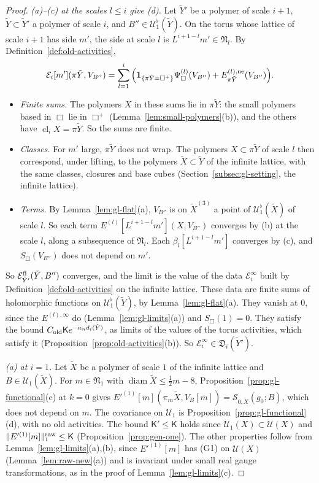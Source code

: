 \begin{proof}
\emph{(a)--(c) at the scales $l\le i$ give (d).} Let $\tilde Y'$ be a polymer of scale $i+1$, $\tilde Y\subset\tilde Y'$ a polymer of scale $i$, and $B''\in\mathcal U^\flat_1(\tilde Y)$. On the torus whose lattice of scale $i+1$ has side $m'$, the side at scale $l$ is $L^{i+1-l}m'\in\mathfrak N_l$. By Definition~\ref{def:old-activities},
\[
\mathcal E_i[m'](\pi\tilde Y,V_{B''})=\sum_{l=1}^i\Big(\mathbf 1_{\{\pi\tilde Y=\Box^+\}}\Psi^{(l)}_\Box(V_{B''})+E^{(l),\rm ne}_{\pi\tilde Y}(V_{B''})\Big).
\]
\begin{itemize}
\item \emph{Finite sums.} The polymers $X$ in these sums lie in $\pi\tilde Y$: the small polymers based in $\Box$ lie in $\Box^+$ (Lemma~\ref{lem:small-polymers}(b)), and the others have $\operatorname{cl}_iX=\pi\tilde Y$. So the sums are finite.
\item \emph{Classes.} For $m'$ large, $\pi\tilde Y$ does not wrap. The polymers $X\subset\pi\tilde Y$ of scale $l$ then correspond, under lifting, to the polymers $\tilde X\subset\tilde Y$ of the infinite lattice, with the same classes, closures and base cubes (Section~\ref{subsec:gl-setting}, the infinite lattice).
\item \emph{Terms.} By Lemma~\ref{lem:gl-flat}(a), $V_{B''}$ is on $\tilde X^{(3)}$ a point of $\mathcal U^\flat_1(\tilde X)$ of scale $l$. So each term $E^{(l)}[L^{i+1-l}m'](X,V_{B''})$ converges by (b) at the scale $l$, along a subsequence of $\mathfrak N_l$. Each $\beta_l[L^{i+1-l}m']$ converges by (c), and $S_\Box(V_{B''})$ does not depend on $m'$.
\end{itemize}
So $\mathcal E^{\rm fl}_{\tilde Y'}(\tilde Y,B'')$ converges, and the limit is the value of the data $\mathcal E^\infty_i$ built by Definition~\ref{def:old-activities} on the infinite lattice. These data are finite sums of holomorphic functions on $\mathcal U^\flat_1(\tilde Y)$, by Lemma~\ref{lem:gl-flat}(a). They vanish at $0$, since the $E^{(l),\infty}$ do (Lemma~\ref{lem:gl-limits}(a)) and $S_\Box(1)=0$. They satisfy the bound $C_{\rm old}\mathsf Ke^{-\kappa_nd_i(\tilde Y)}$, as limits of the values of the torus activities, which satisfy it (Proposition~\ref{prop:old-activities}(b)). So $\mathcal E^\infty_i\in\mathfrak D_i(\tilde Y')$.

\emph{(a) at $i=1$.} Let $\tilde X$ be a polymer of scale $1$ of the infinite lattice and $B\in\mathcal U_1(\tilde X)$. For $m\in\mathfrak N_1$ with $\operatorname{diam}\tilde X\le\frac12m-8$, Proposition~\ref{prop:gl-functional}(c) at $k=0$ gives $E'^{(1)}[m](\pi_m\tilde X,V_B[m])=\mathscr S_{0,\tilde X}(g_0;B)$, which does not depend on $m$. The covariance on $\mathcal U_1$ is Proposition~\ref{prop:gl-functional}(d), with no old activities. The bound $\mathsf K'\le\mathsf K$ holds since $\mathcal U_1(X)\subset\mathcal U(X)$ and $\|E'^{(1)}[m]\|^{\rm raw}_1\le\mathsf K$ (Proposition~\ref{prop:gen-one}). The other properties follow from Lemma~\ref{lem:gl-limits}(a),(b), since $E'^{(1)}[m]$ has (G1) on $\mathcal U(X)$ (Lemma~\ref{lem:raw-new}(a)) and is invariant under small real gauge transformations, as in the proof of Lemma~\ref{lem:gl-limits}(c).


\end{proof}
